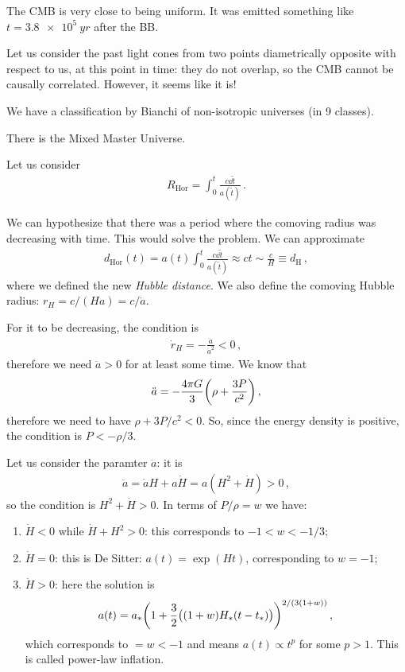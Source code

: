\documentclass[main.tex]{subfiles}
\begin{document}
The CMB is very close to being uniform. It was emitted something like \(t = \SI{3.8e5}{yr}\) after the BB.

Let us consider the past light cones from two points diametrically opposite with respect to us, at this point in time: they do not overlap, so the CMB cannot be causally correlated. However, it seems like it is!


We have a classification by Bianchi of non-isotropic universes (in 9 classes).

There is the Mixed Master Universe.

Let us consider 
%
\begin{align}
  R _{\text{Hor}} = \int_0^{t} \frac{c \dd{\widetilde{t}} }{a(\widetilde{t})}
\,.
\end{align}

We can hypothesize that there was a period where the comoving radius was decreasing with time. This would solve the problem. 
We can approximate 
%
\begin{align}
  d _{\text{Hor}} (t) = a(t) \int_0^{t} \frac{c \dd{\widetilde{t}} }{a(\widetilde{t})} \approx ct \sim \frac{c}{H} \equiv
  d _{\text{H}}
\,,
\end{align}
%
where we defined the new \emph{Hubble distance}.
We also define the comoving Hubble radius: \(r_H = c/(Ha) = c / \dot{a} \).

For it to be decreasing, the condition is 
%
\begin{align}
  \dot{r}_H = - \frac{ \ddot{a} }{\dot{a}^2} <0
\,,
\end{align}
%
therefore we need \(\ddot{a} >0\) for at least some time.
We know that 
%
\begin{align}
  \ddot{a} = -\frac{4 \pi G }{3} \qty(\rho + \frac{3P}{c^2})
\,,
\end{align}
%
therefore we need to have \(\rho + 3P/c^2 <0\).
So, since the energy density is positive, the condition is \(P < - \rho /3\).

Let us consider the paramter \(\ddot{a}\): it is 
%
\begin{align}
  \ddot{a} = \dot{a}H + a \dot{H} = a (H^2 + \dot{H})>0
\,,
\end{align}
%
so the condition is \(H^2+ \dot{H} >0\). In terms of \(P/ \rho = w\) we have:

\begin{enumerate}
    \item \(\dot{H} < 0\) while \(\dot{H} + H^2 >0\): this corresponds to \(-1 < w < -1/3\);
    \item \(\dot{H} =0\): this is De Sitter: \(a(t) = \exp(Ht) \), corresponding to \(w = -1\);
    \item \(\dot{H} >0\): here the solution is 
    \begin{align}
      a(t) = a_{*} \qty(1 + \frac{3}{2}\qty((1+w)H_{*}\qty(t-t_{*})))^{2/ (3(1+w))}
    \,,
    \end{align}
    which corresponds to \(= w<-1\) and means \(a(t) \propto t^{p}\) for some \(p>1\). This is called power-law inflation.
\end{enumerate}
\end{document}
